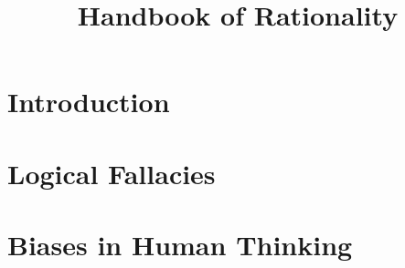 \documentclass[12pt]{article}
\title{Handbook of Rationality}
\begin{document}
\maketitle
\tableofcontents
\cleardoublepage
\section{Introduction}
\section{Logical Fallacies}
\section{Biases in Human Thinking}
\end{document}
